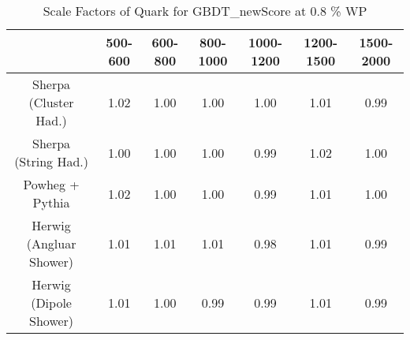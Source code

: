 \begin{table}
\centering
\caption{Scale Factors of Quark for GBDT_newScore at 0.8 \% WP}
\label{tab:SF_MC_GBDT_newScore_0.8_Quark}
\begin{tabular}{ccccccc}
\toprule
{} &  500-600 &  600-800 &  800-1000 &  1000-1200 &  1200-1500 &  1500-2000 \\
\midrule
Sherpa (Cluster Had.)   &     1.02 &     1.00 &      1.00 &       1.00 &       1.01 &       0.99 \\
Sherpa (String Had.)    &     1.00 &     1.00 &      1.00 &       0.99 &       1.02 &       1.00 \\
Powheg + Pythia         &     1.02 &     1.00 &      1.00 &       0.99 &       1.01 &       1.00 \\
Herwig (Angluar Shower) &     1.01 &     1.01 &      1.01 &       0.98 &       1.01 &       0.99 \\
Herwig (Dipole Shower)  &     1.01 &     1.00 &      0.99 &       0.99 &       1.01 &       0.99 \\
\bottomrule
\end{tabular}
\end{table}
